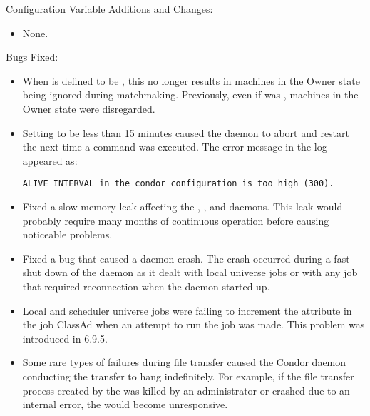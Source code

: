 \noindent Configuration Variable Additions and Changes:

\begin{itemize}

\item None.

\end{itemize}

\noindent Bugs Fixed:

\begin{itemize}

\item When  is defined to be
,
this no longer results in machines in the Owner state being ignored
during matchmaking.  Previously, even if  was ,
machines in the Owner state were disregarded.

\item Setting  to be less than 15 minutes caused the
 daemon to abort and restart the next time a
 command was executed.
The error message in the  log appeared as:

\footnotesize
\begin{verbatim}
ALIVE_INTERVAL in the condor configuration is too high (300).
\end{verbatim}
\normalsize

\item Fixed a slow memory leak affecting the ,
, and  daemons.  This leak would probably
require many months of continuous operation before causing noticeable problems.

\item Fixed a bug that caused a  daemon crash.
The crash occurred during a fast shut down of the
 daemon as it dealt with local universe
jobs or with any job that required reconnection when
the  daemon started up.

\item Local and scheduler universe jobs were failing to increment the
 attribute in the job ClassAd when an attempt to run
the job was made.  This problem was introduced in 6.9.5.

\item Some rare types of failures during file transfer caused the
Condor daemon conducting the transfer to hang indefinitely.  For
example, if the file transfer process created by the 
was killed by an administrator or crashed due to an internal error,
the  would become unresponsive.


\end{itemize}

